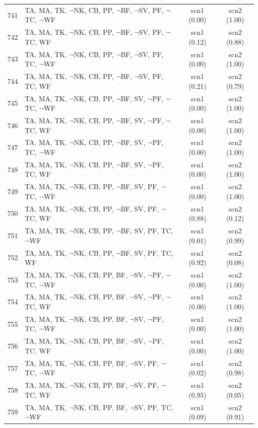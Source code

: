 \documentclass[12pt]{article}
\begin{document}
\begin{longtable}{|l|l|c|c|}
741 & TA, MA, TK, $\neg$NK, CB, PP, $\neg$BF, $\neg$SV, PF, $\neg$TC, $\neg$WF & scn1 (0.00) & scn2 (1.00)\\
742 & TA, MA, TK, $\neg$NK, CB, PP, $\neg$BF, $\neg$SV, PF, $\neg$TC, WF & scn1 (0.12) & scn2 (0.88)\\
743 & TA, MA, TK, $\neg$NK, CB, PP, $\neg$BF, $\neg$SV, PF, TC, $\neg$WF & scn1 (0.00) & scn2 (1.00)\\
744 & TA, MA, TK, $\neg$NK, CB, PP, $\neg$BF, $\neg$SV, PF, TC, WF & scn1 (0.21) & scn2 (0.79)\\
745 & TA, MA, TK, $\neg$NK, CB, PP, $\neg$BF, SV, $\neg$PF, $\neg$TC, $\neg$WF & scn1 (0.00) & scn2 (1.00)\\
746 & TA, MA, TK, $\neg$NK, CB, PP, $\neg$BF, SV, $\neg$PF, $\neg$TC, WF & scn1 (0.00) & scn2 (1.00)\\
747 & TA, MA, TK, $\neg$NK, CB, PP, $\neg$BF, SV, $\neg$PF, TC, $\neg$WF & scn1 (0.00) & scn2 (1.00)\\
748 & TA, MA, TK, $\neg$NK, CB, PP, $\neg$BF, SV, $\neg$PF, TC, WF & scn1 (0.00) & scn2 (1.00)\\
749 & TA, MA, TK, $\neg$NK, CB, PP, $\neg$BF, SV, PF, $\neg$TC, $\neg$WF & scn1 (0.00) & scn2 (1.00)\\
750 & TA, MA, TK, $\neg$NK, CB, PP, $\neg$BF, SV, PF, $\neg$TC, WF & scn1 (0.88) & scn2 (0.12)\\
751 & TA, MA, TK, $\neg$NK, CB, PP, $\neg$BF, SV, PF, TC, $\neg$WF & scn1 (0.01) & scn2 (0.99)\\
752 & TA, MA, TK, $\neg$NK, CB, PP, $\neg$BF, SV, PF, TC, WF & scn1 (0.92) & scn2 (0.08)\\
753 & TA, MA, TK, $\neg$NK, CB, PP, BF, $\neg$SV, $\neg$PF, $\neg$TC, $\neg$WF & scn1 (0.00) & scn2 (1.00)\\
754 & TA, MA, TK, $\neg$NK, CB, PP, BF, $\neg$SV, $\neg$PF, $\neg$TC, WF & scn1 (0.00) & scn2 (1.00)\\
755 & TA, MA, TK, $\neg$NK, CB, PP, BF, $\neg$SV, $\neg$PF, TC, $\neg$WF & scn1 (0.00) & scn2 (1.00)\\
756 & TA, MA, TK, $\neg$NK, CB, PP, BF, $\neg$SV, $\neg$PF, TC, WF & scn1 (0.00) & scn2 (1.00)\\
757 & TA, MA, TK, $\neg$NK, CB, PP, BF, $\neg$SV, PF, $\neg$TC, $\neg$WF & scn1 (0.02) & scn2 (0.98)\\
758 & TA, MA, TK, $\neg$NK, CB, PP, BF, $\neg$SV, PF, $\neg$TC, WF & scn1 (0.95) & scn2 (0.05)\\
759 & TA, MA, TK, $\neg$NK, CB, PP, BF, $\neg$SV, PF, TC, $\neg$WF & scn1 (0.09) & scn2 (0.91)\\

\end{longtable}
\end{document}
